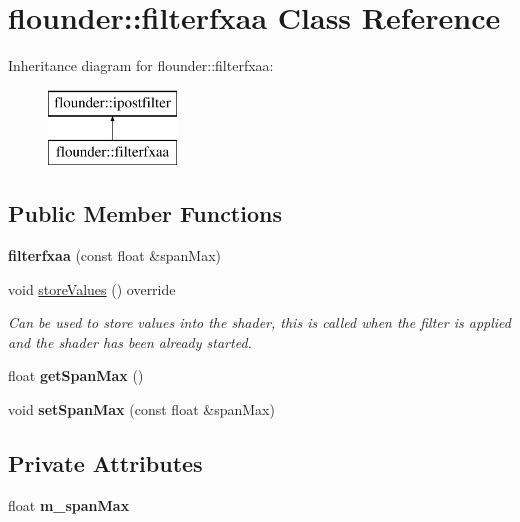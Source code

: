 \hypertarget{classflounder_1_1filterfxaa}{}\section{flounder\+:\+:filterfxaa Class Reference}
\label{classflounder_1_1filterfxaa}
Inheritance diagram for flounder\+:\+:filterfxaa\+:\begin{figure}[H]
\begin{center}
\leavevmode
\includegraphics[height=2.000000cm]{classflounder_1_1filterfxaa}
\end{center}
\end{figure}
\subsection*{Public Member Functions}
\begin{DoxyCompactItemize}
\item 
\mbox{\label{classflounder_1_1filterfxaa_aedc837c39551ff54c89704d3f14975e1}} 
{\bfseries filterfxaa} (const float \&span\+Max)
\item 
void \hyperlink{classflounder_1_1filterfxaa_abee255cfd538d96881386157e6e8eea0}{store\+Values} () override
\begin{DoxyCompactList}\small\item\em Can be used to store values into the shader, this is called when the filter is applied and the shader has been already started. \end{DoxyCompactList}\item 
\mbox{\label{classflounder_1_1filterfxaa_a8ff0740ed5a503f108e6b0b73e8e36f8}} 
float {\bfseries get\+Span\+Max} ()
\item 
\mbox{\label{classflounder_1_1filterfxaa_a0d3b09024e4966bdafecbc5b388cc129}} 
void {\bfseries set\+Span\+Max} (const float \&span\+Max)
\end{DoxyCompactItemize}
\subsection*{Private Attributes}
\begin{DoxyCompactItemize}
\item 
\mbox{\label{classflounder_1_1filterfxaa_a6f59a5c3990455c2ddb30e2df9e1a140}} 
float {\bfseries m\+\_\+span\+Max}
\end{DoxyCompactItemize}
